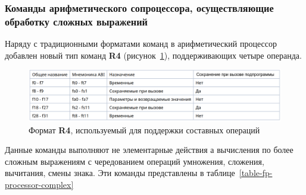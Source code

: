 \subsubsection{Команды арифметического сопроцессора, осуществляющие обработку сложных выражений}

Наряду с традиционными форматами команд в арифметический процессор добавлен новый тип команд \textbf{R4} (рисунок~\ref{fp-r4-type}), поддерживающих четыре операнда.

\begin{figure}[htbp]
    \centering
    \includegraphics[width=1.0\textwidth]{img/fp-registers.png}
    \caption{Формат \textbf{R4}, используемый для поддержки составных операций}
    \label{fp-r4-type}
\end{figure}
Данные команды выполняют не элементарные действия а вычисления по более сложным выражениям с чередованием операций умножения, сложения, вычитания, смены знака. Эти команды представлены в таблице~\ref{table-fp-processor-complex}

